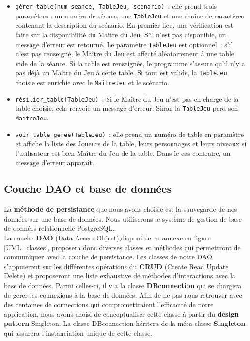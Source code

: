 \documentclass[11pt]{article}
\begin{document}
\begin{itemize}[label=, font=\small]
    \item \texttt{gérer\_table(num\_seance, TableJeu, scenario)}~: elle prend trois paramètres : un numéro de séance, une \texttt{TableJeu} et une chaîne de caractères contenant la description du scénario. En premier lieu, une vérification est faite sur la disponibilité du Maître du Jeu. S'il n'est pas disponible, un message d'erreur est retourné. Le paramètre \texttt{TableJeu} est optionnel~: s'il n'est pas renseigné, le Maître du Jeu est affecté aléatoirement à une table vide de la séance. Si la table est renseignée, le programme s'assure qu'il n'y a pas déjà un Maître du Jeu à cette table. Si tout est valide, la \texttt{TableJeu} choisie est enrichie avec le \texttt{MaitreJeu} et le scénario.
    
    \item \texttt{résilier\_table(TableJeu)}~: Si le Maître du Jeu n'est pas en charge de la table choisie, cela renvoie un message d'erreur. Sinon la \texttt{TableJeu} perd son \texttt{MaitreJeu}.
    
    \item \texttt{voir\_table\_geree(TableJeu)}~: elle prend un numéro de table en paramètre et affiche la liste des Joueurs de la table, leurs personnages et leurs niveaux si l'utilisateur est bien Maître du Jeu de la table. Dans le cas contraire, un message d'erreur apparaît.
\end{itemize}





\subsection{Couche DAO et base de données}

La \textbf{méthode de persistance} que nous avons choisie est la sauvegarde de nos données sur une base de données. Nous utiliserons le système de gestion de base de données relationnelle PostgreSQL.\\

La couche \textbf{DAO} (Data Access Object),disponible en annexe en figure \ref{UML_classes}, proposera donc diverses classes et méthodes qui permettront de communiquer avec la couche de persistance. Les classes de notre DAO s'appuieront sur les différentes opérations du \textbf{CRUD} (Create Read Update Delete) et proposeront une liste exhaustive de méthodes d'interactions avec la base de données. Parmi celles-ci, il y a la classe \textbf{DBconnection} qui se chargera de gerer les connexions à la base de données. Afin de ne pas nous retrouver avec des centaines de connections qui compromettraient l'efficacité de notre application, nous avons choisi de conceptualiser cette classe à partir du \textbf{design pattern} Singleton. La classe DBconnection héritera de la méta-classe \textbf{Singleton} qui assurera l'instanciation unique de cette classe.
\end{document}
